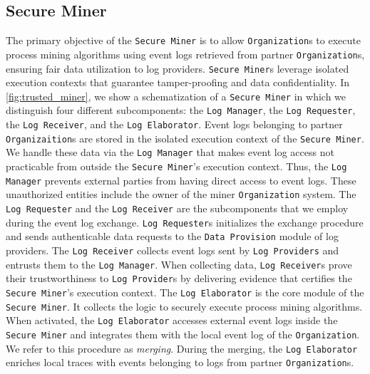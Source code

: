 \subsection{Secure Miner}
The primary objective of the \texttt{Secure Miner} is to allow \texttt{Organization}s to execute process mining algorithms using %
event logs retrieved from partner \texttt{Organization}s, ensuring fair data utilization to log providers. \texttt{Secure Miner}s leverage isolated execution contexts that guarantee tamper-proofing and data confidentiality. In \cref{fig:trusted_miner}, we show a schematization of a \texttt{Secure Miner} in which we distinguish four different subcomponents: the \texttt{Log Manager}, the \texttt{Log Requester}, the \texttt{Log Receiver}, and the \texttt{Log Elaborator}. Event logs belonging to partner \texttt{Organizaition}s are stored in the isolated execution context of the \texttt{Secure Miner}. We handle these data via the \texttt{Log Manager} that makes event log access not practicable from outside the \texttt{Secure Miner}'s execution context. Thus, the \texttt{Log Manager} prevents external parties from having direct access to event logs. These unauthorized entities include the owner of the miner \texttt{Organization} system. The \texttt{Log Requester} and the \texttt{Log Receiver} are the subcomponents that we employ during the event log exchange. \texttt{Log Requester}s initializes the exchange procedure and sends authenticable data requests to the \texttt{Data Provision} module of log providers. The \texttt{Log Receiver} collects event logs sent by \texttt{Log Providers} and entrusts them to the \texttt{Log Manager}. When collecting data, \texttt{Log Receiver}s prove their trustworthiness to \texttt{Log Provider}s by delivering evidence that certifies the \texttt{Secure Miner}'s execution context. The \texttt{Log Elaborator} is the core module of the \texttt{Secure Miner}. It collects the logic to securely execute process mining algorithms. 
When activated, the \texttt{Log Elaborator} accesses external event logs inside the \texttt{Secure Miner} and integrates them with the local event log of the \texttt{Organization}. We refer to this procedure as \textit{merging}. During the merging, the \texttt{Log Elaborator} enriches local traces with events belonging to logs from partner \texttt{Organization}s.



